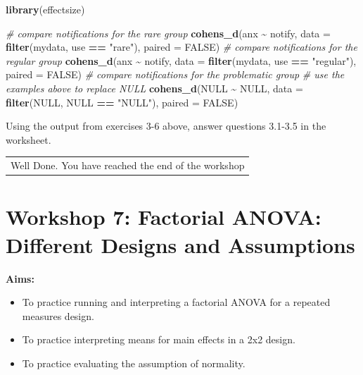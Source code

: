 \documentclass[
]{book}
\newenvironment{Shaded}{\begin{snugshade}}{\end{snugshade}}
\newcommand{\AttributeTok}[1]{\textcolor[rgb]{0.13,0.29,0.53}{#1}}
\newcommand{\CommentTok}[1]{\textcolor[rgb]{0.56,0.35,0.01}{\textit{#1}}}
\newcommand{\ConstantTok}[1]{\textcolor[rgb]{0.56,0.35,0.01}{#1}}
\newcommand{\FunctionTok}[1]{\textcolor[rgb]{0.13,0.29,0.53}{\textbf{#1}}}
\newcommand{\NormalTok}[1]{#1}
\newcommand{\SpecialCharTok}[1]{\textcolor[rgb]{0.81,0.36,0.00}{\textbf{#1}}}
\newcommand{\StringTok}[1]{\textcolor[rgb]{0.31,0.60,0.02}{#1}}
\providecommand{\tightlist}{%
  \setlength{\itemsep}{0pt}\setlength{\parskip}{0pt}}
\begin{document}
\begin{Shaded}
\begin{Highlighting}[]
\FunctionTok{library}\NormalTok{(effectsize)}

\CommentTok{\# compare notifications for the rare group}
\FunctionTok{cohens\_d}\NormalTok{(anx }\SpecialCharTok{\textasciitilde{}}\NormalTok{ notify, }
         \AttributeTok{data =} \FunctionTok{filter}\NormalTok{(mydata, use }\SpecialCharTok{==} \StringTok{"rare"}\NormalTok{), }
         \AttributeTok{paired =} \ConstantTok{FALSE}\NormalTok{)}
\CommentTok{\# compare notifications for the regular group}
\FunctionTok{cohens\_d}\NormalTok{(anx }\SpecialCharTok{\textasciitilde{}}\NormalTok{ notify, }
         \AttributeTok{data =} \FunctionTok{filter}\NormalTok{(mydata, use }\SpecialCharTok{==} \StringTok{"regular"}\NormalTok{), }
         \AttributeTok{paired =} \ConstantTok{FALSE}\NormalTok{)}
\CommentTok{\# compare notifications for the problematic group}
\CommentTok{\# use the examples above to replace \textasciigrave{}NULL\textasciigrave{}}
\FunctionTok{cohens\_d}\NormalTok{(}\ConstantTok{NULL} \SpecialCharTok{\textasciitilde{}} \ConstantTok{NULL}\NormalTok{, }
         \AttributeTok{data =} \FunctionTok{filter}\NormalTok{(}\ConstantTok{NULL}\NormalTok{, }\ConstantTok{NULL} \SpecialCharTok{==} \StringTok{"NULL"}\NormalTok{), }
         \AttributeTok{paired =} \ConstantTok{FALSE}\NormalTok{)}
\end{Highlighting}
\end{Shaded}

Using the output from exercises 3-6 above, answer questions 3.1-3.5 in the worksheet.

\begin{longtable}[]{@{}l@{}}
\toprule\noalign{}
\endhead
\bottomrule\noalign{}
\endlastfoot
Well Done. You have reached the end of the workshop \\
\end{longtable}

\chapter{Workshop 7: Factorial ANOVA: Different Designs and Assumptions}\label{workshop-7-factorial-anova-different-designs-and-assumptions}

\textbf{Aims:}

\begin{itemize}
\tightlist
\item
  To practice running and interpreting a factorial ANOVA for a repeated measures design.
\item
  To practice interpreting means for main effects in a 2x2 design.
\item
  To practice evaluating the assumption of normality.
\end{itemize}
\end{document}
